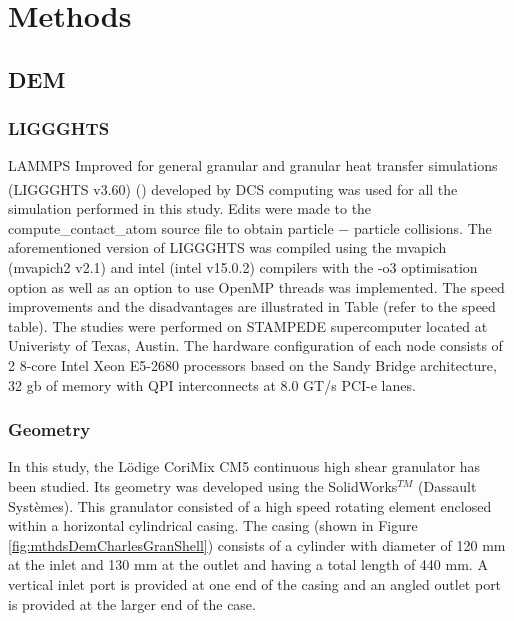 \documentclass[preprint,11pt,authoryear]{elsarticle}
\begin{document}
	
	
	\section{Methods}
	
	  \subsection{DEM}
	    \subsubsection{LIGGGHTS}
	    	\par LAMMPS Improved for general granular and granular heat transfer simulations (LIGGGHTS\textsuperscript{\textregistered} v3.60) (\cite{Kloss2012}) developed by DCS computing was used for all the simulation performed in this study. Edits were made to the compute\_contact\_atom source file to obtain particle $-$ particle collisions. The aforementioned version of LIGGGHTS was compiled using the mvapich (mvapich2 v2.1) and intel (intel v15.0.2) compilers with the -o3 optimisation option as well as an option to use OpenMP threads was implemented. The speed improvements and the disadvantages are illustrated in Table (refer to the speed table). The studies were performed on STAMPEDE supercomputer located at Univeristy of Texas, Austin. The hardware configuration of each node consists of 2 8-core Intel Xeon E5-2680 processors based on the Sandy Bridge architecture, 32 gb of memory with QPI interconnects at 8.0 GT/s PCI-e lanes.

	        
	    \subsubsection{Geometry}    
	    
	    \par In this study, the L\"{o}dige CoriMix CM5 continuous high shear granulator has been studied. Its geometry was developed using the SolidWorks$^{TM}$ (Dassault Syst\`{e}mes). This granulator consisted of a high speed rotating element enclosed within a horizontal cylindrical casing. The casing (shown in Figure \ref{fig:mthdsDemCharlesGranShell}) consists of a cylinder with diameter of 120 mm at the inlet and 130 mm at the outlet and having a total length of 440 mm. A vertical inlet port is provided at one end of the casing and an angled outlet port is provided at the larger end of the case. 
	
\end{document}
